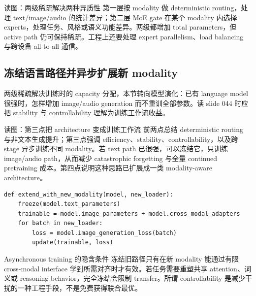 
\begin{knowledgebox}{读图：两级稀疏解决两种异质性}
第一层按 modality 做 deterministic routing，处理 text/image/audio 的统计差异；第二层 MoE gate 在某个 modality 内选择 experts，处理任务、风格或语义功能差异。两级都增加 total parameters，但 active path 仍可保持稀疏。工程上还要处理 expert parallelism、load balancing 与跨设备 all-to-all 通信。
\end{knowledgebox}


\subsection{冻结语言路径并异步扩展新 modality}

两级稀疏解决训练时的 capacity 分配，本节转向模型演化：已有 language model 很强时，怎样增加 image/audio generation 而不重训全部参数。读 slide 044 时应把 stability 与 controllability 理解为训练工作流收益。


\begin{knowledgebox}{读图：第三点把 architecture 变成训练工作流}
前两点总结 deterministic routing 与非文本生成提升；第三点强调 efficiency、stability、controllability，以及跨 stage 异步训练不同 modality。若 text path 已很强，可以冻结它，只训练 image/audio path，从而减少 catastrophic forgetting 与全量 continued pretraining 成本。第四点说明这种思路已扩展成一类 modality-aware architecture。
\end{knowledgebox}

\begin{lstlisting}[caption={冻结已有 language path，扩展新的 generation modality}]
def extend_with_new_modality(model, new_loader):
    freeze(model.text_parameters)
    trainable = model.image_parameters + model.cross_modal_adapters
    for batch in new_loader:
        loss = model.image_generation_loss(batch)
        update(trainable, loss)
\end{lstlisting}

\begin{warningbox}{Asynchronous training 的隐含条件}
冻结旧路径只有在新 modality 能通过有限 cross-modal interface 学到所需对齐时才有效。若任务需要重塑共享 attention、词义或 reasoning behavior，完全冻结会限制 transfer。所谓 controllability 是减少干扰的一种工程手段，不是免费获得联合最优。
\end{warningbox}

